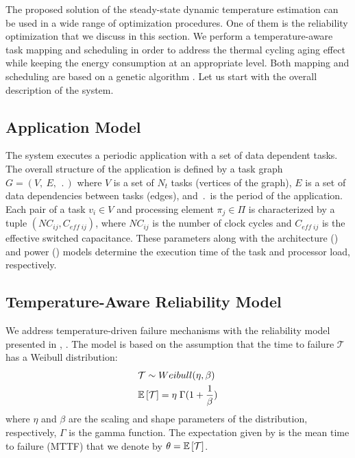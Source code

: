 The proposed solution of the steady-state dynamic temperature estimation can be used in a wide range of optimization procedures. One of them is the reliability optimization that we discuss in this section. We perform a temperature-aware task mapping and scheduling in order to address the thermal cycling aging effect while keeping the energy consumption at an appropriate level. Both mapping and scheduling are based on a genetic algorithm \cite{schmitz2004}. Let us start with the overall description of the system.

\subsection{Application Model}
The system executes a periodic application with a set of data dependent tasks. The overall structure of the application is defined by a task graph $G = (V, \: E, \: \period)$ where $V$ is a set of $N_t$ tasks (vertices of the graph), $E$ is a set of data dependencies between tasks (edges), and $\period$ is the period of the application. Each pair of a task $v_i \in V$ and processing element $\pi_j \in \Pi$ is characterized by a tuple $(NC_{ij}, C_{eff \; ij})$, where $NC_{ij}$ is the number of clock cycles and $C_{eff \; ij}$ is the effective switched capacitance. These parameters along with the architecture () and power () models determine the execution time of the task and processor load, respectively.

\subsection{Temperature-Aware Reliability Model} \label{sec:reliability-model}
We address temperature-driven failure mechanisms with the reliability model presented in \cite{huang2009}, \cite{xiang2010}. The model is based on the assumption that the time to failure $\mathcal{T}$ has a Weibull distribution:
\begin{align}
  & \mathcal{T} \sim Weibull(\eta, \beta) \nonumber \\
  & \mathbb{E}\left[ \mathcal{T} \right] = \eta \; \Gamma(1 + \frac{1}{\beta}) \label{eq:general-mttf}
\end{align}
where $\eta$ and $\beta$ are the scaling and shape parameters of the distribution, respectively, $\Gamma$ is the gamma function. The expectation given by  is the mean time to failure (MTTF) that we denote by $\theta = \mathbb{E}\left[ \mathcal{T} \right]$.

